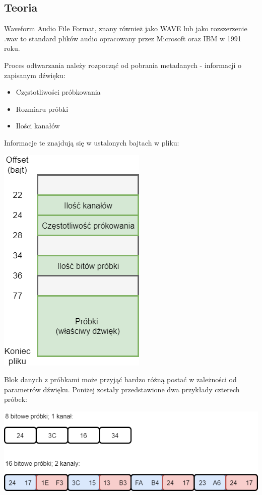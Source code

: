 \documentclass{article}
\begin{document}
\subsection{Teoria}
\par Waveform Audio File Format, znany również jako WAVE lub jako rozszerzenie .wav to standard plików audio opracowany przez Microsoft oraz IBM w 1991 roku\cite{wiki}.
\par Proces odtwarzania należy rozpocząć od pobrania metadanych - informacji o zapisanym dźwięku:
\begin{itemize}
	\item Częstotliwości próbkowania
	\item Rozmiaru próbki
	\item Ilości kanałów
\end{itemize}
\par Informacje te znajdują się w ustalonych bajtach w pliku\cite{wave}:
\begin{center}
	\includegraphics[scale=0.6, center]{photo/wav_format.png}
\end{center}

\newpage
\par Blok danych z próbkami może przyjąć bardzo różną postać w zależności od parametrów dźwięku. Poniżej zostały przedstawione dwa przykłady czterech próbek:
\begin{center}
	\includegraphics[scale=0.6, center]{photo/samples.png}
\end{center}
\end{document}
